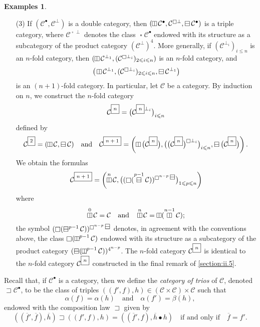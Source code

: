 \documentclass[a4paper,fleqn]{article}
\theoremstyle{plain}
\theoremstyle{definition}
\newtheorem*{examples}{Examples}
\renewcommand{\leq}{\leqslant}
\newcommand{\oldpage}[1]{{\marginpar{\footnotesize$\bigg\vert$\,\,\,\,\textit{p.~#1}}}}
\newcommand{\textand}{\quad\text{and}\quad}
\newcommand{\CC}{\mathcal{C}}
\newcommand{\boxnum}[1]{{\fbox{\scriptsize${#1}$\vphantom{$jk$}}}}
\newcommand{\hsqbox}{{\boxminus}}
\newcommand{\vsqbox}{{\rotatebox{90}{$\boxminus$}}}
\DeclareMathOperator{\sq}{\square}
\DeclareMathOperator{\hsq}{\raisebox{-.05em}{$\hsqbox$}}
\DeclareMathOperator{\vsq}{\raisebox{-.1em}{$\vsqbox$}}
\DeclareMathOperator{\trio}{\sqsupset}
\begin{document}
\begin{examples}
\begin{enumerate}
    \item[\normalfont(3)]
      If $(\CC^\bullet,\CC^\perp)$ is a double category, then $(\vsq\CC^\bullet,\CC^{\sq\perp},\hsq\CC^\bullet)$ is a triple category, where $\CC^{\sq\perp}$ denotes the class $\sq\CC^\bullet$ endowed with its structure as a subcategory of the product category $(\CC^\perp)^4$.
      \oldpage{423}
      More generally, if $(\CC^{\perp_i})_{i\leq n}$ is an $n$-fold category, then $(\vsq\CC^{\perp_1},(\CC^{\sq\perp_i})_{2\leq i\leq n})$ is an $n$-fold category, and
      \[
        \big(
          \vsq\CC^{\perp_1},
          (\CC^{\sq\perp_i})_{2\leq i\leq n},
          \hsq\CC^{\perp_1}
        \big)
      \]
      is an $(n+1)$-fold category.
      In particular, let $\CC$ be a category.
      By induction on  $n$, we construct the $n$-fold category
      \[
        \CC^\boxnum{n}
        = \big(\CC^{\boxnum{n}\perp_i}\big)_{i\leq n}
      \]
      defined by
      \[
        \CC^\boxnum{2} = (\vsq\CC,\hsq\CC)
        \textand
        \CC^\boxnum{n+1} = \left(
          \vsq\big(\CC^\boxnum{n}\big),
          \big(\big(\CC^\boxnum{n}\big)^{\sq\perp_i}\big)_{i\leq n},
          \hsq\big(\CC^\boxnum{n}\big)
        \right).
      \]
      We obtain the formulas
      \[
        \CC^\boxnum{n+1}
        = \left(
          \vsq^n\CC,
          \big((\sq(\hsq^{p-1}\CC))^{\sq^{n-p}\hsq}\big)_{1\leq p\leq n}
        \right)
      \]
      where
      \[
        \vsq^0\CC = \CC
        \textand
        \vsq^n\CC = \vsq(\vsq^{n-1}\CC);
      \]
      the symbol $(\sq(\hsq^{p-1}\CC))^{\sq^{n-p}\hsq}$ denotes, in agreement with the conventions above, the class $\sq(\vsq^{p-1}\CC)$ endowed with its structure as a subcategory of the product category $(\hsq(\vsq^{p-1}\CC))^{4^{n-p}}$.
      The $n$-fold category $\CC^\boxnum{n}$ is identical to the $n$-fold category $\CC^\boxnum{n}$ constructed in the final remark of \cref{section:ii.5}.
  \end{enumerate}
\end{examples}

Recall that, if $\CC^\bullet$ is a category, then we define the \emph{category of trios} of $\CC$, denoted $\trio\CC^\bullet$, to be the class of triples $((f',f),h)\in(\CC\times\CC)\times\CC$ such that
\[
  \alpha(f)=\alpha(h)
  \textand
  \alpha(f')=\beta(h),
\]
endowed with the composition law $\sqsupset$ given by
\[
  ((\overline{f}',\overline{f}),\overline{h}) \sqsupset ((f',f),h)
  = ((\overline{f}',f),\overline{h}\bullet h)
  \quad\text{if and only if}\quad
  \overline{f}=f'.
\]
\end{document}
